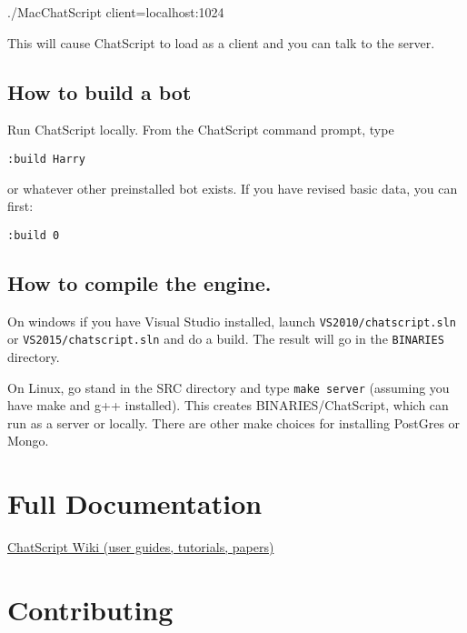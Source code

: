 \documentclass[]{article}
\newenvironment{Shaded}{}{}
\newcommand{\ExtensionTok}[1]{#1}
\newcommand{\NormalTok}[1]{#1}
\begin{document}
\begin{Shaded}
\begin{Highlighting}[]
\ExtensionTok{./MacChatScript}\NormalTok{ client=localhost:1024}
\end{Highlighting}
\end{Shaded}

This will cause ChatScript to load as a client and you can talk to the
server.

\subsection{How to build a bot}\label{how-to-build-a-bot}

Run ChatScript locally. From the ChatScript command prompt, type

\begin{verbatim}
:build Harry
\end{verbatim}

or whatever other preinstalled bot exists. If you have revised basic
data, you can first:

\begin{verbatim}
:build 0
\end{verbatim}

\subsection{How to compile the
engine.}\label{how-to-compile-the-engine.}

On windows if you have Visual Studio installed, launch
\texttt{VS2010/chatscript.sln} or \texttt{VS2015/chatscript.sln} and do
a build. The result will go in the \texttt{BINARIES} directory.

On Linux, go stand in the SRC directory and type \texttt{make\ server}
(assuming you have make and g++ installed). This creates
BINARIES/ChatScript, which can run as a server or locally. There are
other make choices for installing PostGres or Mongo.

\section{Full Documentation}\label{full-documentation}

\href{/WIKI/README.md}{ChatScript Wiki (user guides, tutorials, papers)}

\section{Contributing}\label{contributing}
\end{document}
